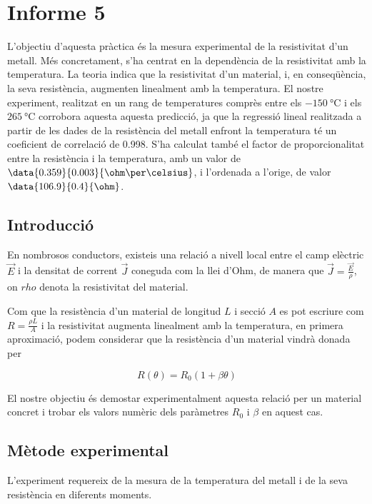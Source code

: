 
\chapter{Informe 5}
\begin{resum}
	L'objectiu d'aquesta pràctica és la mesura experimental de la resistivitat d'un metall. Més concretament, s'ha centrat en la dependència de la resistivitat amb la temperatura. La teoria indica que la resistivitat d'un material, i, en conseqüència, la seva resistència, augmenten linealment amb la temperatura. El nostre experiment, realitzat en un rang de temperatures comprès entre els $\SI{-150}{\celsius}$ i els $\SI{265}{\celsius}$ corrobora aquesta aquesta predicció, ja que la regressió lineal realitzada a partir de les dades de la resistència del metall enfront la temperatura té un coeficient de correlació de 0.998. S'ha calculat també el factor de proporcionalitat entre la resistència i la temperatura, amb un valor de $\data{0.359}{0.003}{\ohm\per\celsius}$, i l'ordenada a l'orige, de valor $\data{106.9}{0.4}{\ohm}$.
\end{resum}

\section{Introducció}
En nombrosos conductors, existeis una relació a nivell local entre el camp elèctric $\vec{E}$ i la densitat de corrent $\vec{J}$ coneguda com la llei d'Ohm, de manera que $\vec{J}=\frac{\vec{E}}{\rho}$, on $rho$ denota la resistivitat del material.

Com que la resistència d'un material de longitud $L$ i secció $A$ es pot escriure com $R=\frac{\rho L}{A}$ i la resistivitat augmenta linealment amb la temperatura, en primera aproximació, podem considerar que la resistència d'un material vindrà donada per 

\begin{equation} \label{eq: <regressio>}
R(\theta)=R_0(1+\beta\theta)
\end{equation}

El nostre objectiu és demostar experimentalment aquesta relació per un material concret i trobar els valors numèric dels paràmetres $R_0$ i $\beta$ en aquest cas.

\section{Mètode experimental}

L'experiment requereix de la mesura de la temperatura del metall i de la seva resistència en diferents moments.

